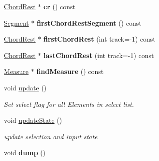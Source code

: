 \begin{DoxyCompactItemize}
\hyperlink{class_ms_1_1_chord_rest}{Chord\+Rest} $\ast$ {\bfseries cr} () const
\item 
\mbox{\label{class_ms_1_1_selection_a96d86a0281f31853e51bdb6c8dcf2c12}} 
\hyperlink{class_ms_1_1_segment}{Segment} $\ast$ {\bfseries first\+Chord\+Rest\+Segment} () const
\item 
\mbox{\label{class_ms_1_1_selection_aa987ed47ede867a2ed6b1015a09ea3a9}} 
\hyperlink{class_ms_1_1_chord_rest}{Chord\+Rest} $\ast$ {\bfseries first\+Chord\+Rest} (int track=-\/1) const
\item 
\mbox{\label{class_ms_1_1_selection_a832d71c0a01cd82c2ed9a8f8d1e29cfc}} 
\hyperlink{class_ms_1_1_chord_rest}{Chord\+Rest} $\ast$ {\bfseries last\+Chord\+Rest} (int track=-\/1) const
\item 
\mbox{\label{class_ms_1_1_selection_a9cd8eee1b69e38e54123fa31511cf9c5}} 
\hyperlink{class_ms_1_1_measure}{Measure} $\ast$ {\bfseries find\+Measure} () const
\item 
\mbox{\label{class_ms_1_1_selection_ace142b327a6958482567a7dd613263f5}} 
void \hyperlink{class_ms_1_1_selection_ace142b327a6958482567a7dd613263f5}{update} ()
\begin{DoxyCompactList}\small\item\em Set select flag for all Elements in select list. \end{DoxyCompactList}\item 
\mbox{\label{class_ms_1_1_selection_add848d9742be4a308544864ab11772d2}} 
void \hyperlink{class_ms_1_1_selection_add848d9742be4a308544864ab11772d2}{update\+State} ()
\begin{DoxyCompactList}\small\item\em update selection and input state \end{DoxyCompactList}\item 
\mbox{\label{class_ms_1_1_selection_a59d71068e17af5eb8be5ce6a35cce532}} 
void {\bfseries dump} ()
\item 
\mbox{\label{class_ms_1_1_selection_a2f0da0a7ca2a9d2941293fd554ce7983}} 

\end{DoxyCompactItemize}
